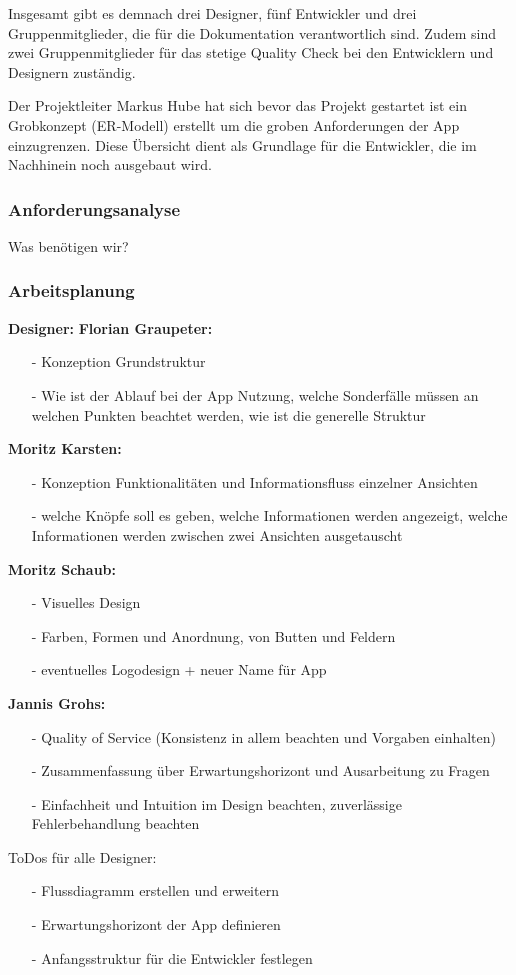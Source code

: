 \documentclass[12pt,a4paper]{article}
\begin{document}
Insgesamt gibt es demnach drei Designer, fünf Entwickler und drei Gruppenmitglieder, die für die Dokumentation verantwortlich sind. Zudem sind zwei Gruppenmitglieder für das stetige Quality Check bei den Entwicklern und Designern zuständig.

Der Projektleiter Markus Hube hat sich bevor das Projekt gestartet ist ein Grobkonzept (ER-Modell) erstellt um die groben Anforderungen der App einzugrenzen. Diese Übersicht dient als Grundlage für die Entwickler, die im Nachhinein noch ausgebaut wird.
\newpage

\subsubsection{Anforderungsanalyse}
Was benötigen wir? 
\newpage

\subsubsection{Arbeitsplanung}
\textbf{Designer:}
\textbf{Florian Graupeter:}
\begin{itemize}
\item[-]Konzeption Grundstruktur
\item[-]Wie ist der Ablauf bei der App Nutzung, welche Sonderfälle müssen an welchen Punkten beachtet werden, wie ist die generelle Struktur
\end{itemize}
\textbf{Moritz Karsten:}
\begin{itemize}
\item[-]Konzeption Funktionalitäten und Informationsfluss einzelner Ansichten
\item[-]welche Knöpfe soll es geben, welche Informationen werden angezeigt, welche Informationen werden zwischen zwei Ansichten ausgetauscht
\end{itemize}
\textbf{Moritz Schaub:}
\begin{itemize}
\item[-]Visuelles Design
\item[-]Farben, Formen und Anordnung, von Butten und Feldern 
\item[-]eventuelles Logodesign + neuer Name für App
\end{itemize}
\textbf{Jannis Grohs:}
\begin{itemize}
\item[-]Quality of Service (Konsistenz in allem beachten und Vorgaben einhalten)
\item[-]Zusammenfassung über Erwartungshorizont und Ausarbeitung zu Fragen
\item[-]Einfachheit und Intuition im Design beachten, zuverlässige Fehlerbehandlung beachten
\end{itemize}
ToDos für alle Designer:
\begin{itemize}
\item[-]Flussdiagramm erstellen und erweitern
\item[-]Erwartungshorizont der App definieren
\item[-]Anfangsstruktur für die Entwickler festlegen
\end{itemize}
\newpage
\end{document}
